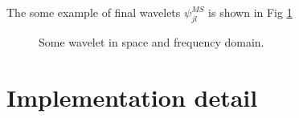 \documentclass{article}
\begin{document}
	The some example of final wavelets $\psi^{MS}_{jl}$ is shown in Fig \ref{fig:wavelet}
	\begin{figure}[h]
		\centering
		\caption{Some wavelet in space and frequency domain.}
		\label{fig:wavelet}
	\end{figure}
	
	\section{Implementation detail}



\end{document}

